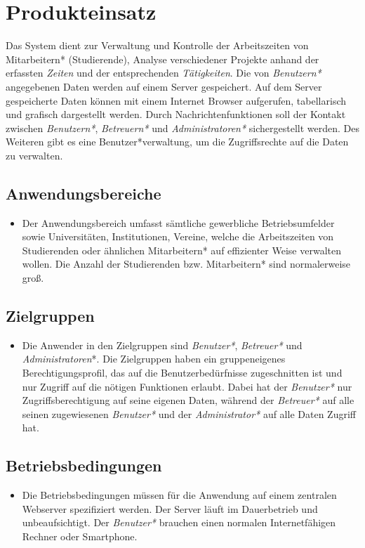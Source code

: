 \section{Produkteinsatz}
Das System dient zur Verwaltung und Kontrolle der Arbeitszeiten von Mitarbeitern* (Studierende), Analyse verschiedener Projekte anhand der erfassten \emph{Zeiten} und der entsprechenden \emph{Tätigkeiten}.
Die von \emph{Benutzern*} angegebenen Daten werden auf einem Server gespeichert. Auf dem Server gespeicherte Daten können mit einem Internet Browser aufgerufen, tabellarisch und grafisch dargestellt werden.
Durch Nachrichtenfunktionen soll der Kontakt zwischen \emph{Benutzern*}, \emph{Betreuern*} und \emph{Administratoren*} sichergestellt werden.
Des Weiteren gibt es eine Benutzer*verwaltung, um die Zugriffsrechte auf die Daten zu verwalten.
\subsection{Anwendungsbereiche}
\begin{itemize}
	\item Der Anwendungsbereich umfasst sämtliche gewerbliche Betriebsumfelder sowie Universitäten, Institutionen, Vereine,
	welche die Arbeitszeiten von Studierenden oder ähnlichen Mitarbeitern* auf effizienter Weise verwalten wollen. Die Anzahl der Studierenden bzw. Mitarbeitern* sind normalerweise groß.
\end{itemize}

\subsection{Zielgruppen}
\begin{itemize}
	\item Die Anwender in den Zielgruppen sind \emph{Benutzer*}, \emph{Betreuer*} und \emph{Administratoren}*.
	Die Zielgruppen haben ein gruppeneigenes Berechtigungsprofil, das auf die Benutzerbedürfnisse zugeschnitten ist und nur Zugriff auf die nötigen Funktionen erlaubt.
	Dabei hat der \emph{Benutzer*} nur Zugriffsberechtigung auf seine eigenen Daten, während der \emph{Betreuer*} auf alle seinen zugewiesenen \emph{Benutzer*} und der \emph{Administrator*} auf alle Daten Zugriff hat.
\end{itemize}

\subsection{Betriebsbedingungen}
\begin{itemize}
	\item Die Betriebsbedingungen müssen für die Anwendung auf einem zentralen Webserver spezifiziert werden. Der Server läuft im Dauerbetrieb und unbeaufsichtigt.
	Der \emph{Benutzer*} brauchen einen normalen Internetfähigen Rechner oder Smartphone.
\end{itemize}
